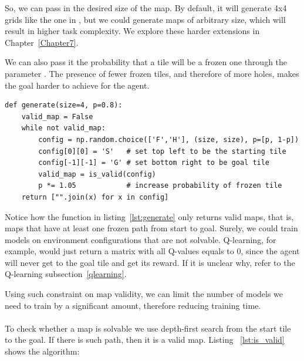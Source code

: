 So, we can pass in the desired size of the map. By default, it will generate 4x4 grids like the one in , but we could generate maps of arbitrary size, which will result in higher task complexity. We explore these harder extensions in Chapter~\ref{Chapter7}. 

We can also pass it the probability that a tile will be a frozen one through the parameter . The presence of fewer frozen tiles, and therefore of more holes, makes the goal harder to achieve for the agent.

\begin{minipage}{\linewidth}
\lstset{language=Python}
\lstset{frame=lines}
\lstset{basicstyle=\footnotesize}
\begin{lstlisting}
def generate(size=4, p=0.8):
    valid_map = False
    while not valid_map:
        config = np.random.choice(['F','H'], (size, size), p=[p, 1-p])
        config[0][0] = 'S'   # set top left to be the starting tile
        config[-1][-1] = 'G' # set bottom right to be goal tile
        valid_map = is_valid(config)
        p *= 1.05            # increase probability of frozen tile
    return ["".join(x) for x in config]
\end{lstlisting}
\end{minipage}

Notice how the  function in listing~\ref{lst:generate} only returns valid maps, that is, maps that have at least one frozen path from start to goal. Surely, we could train models on environment configurations that are not solvable. Q-learning, for example, would just return a  matrix with all Q-values equals to $0$, since the agent will never get to the goal tile and get its reward. If it is unclear why, refer to the Q-learning subsection~\ref{qlearning}.

Using such constraint on map validity, we can limit the number of models we need to train by a significant amount, therefore reducing training time.
\\\\
To check whether a map is solvable we use depth-first search from the start tile to the goal. If there is such path, then it is a valid map. Listing ~\ref{lst:is_valid} shows the algorithm:\\

